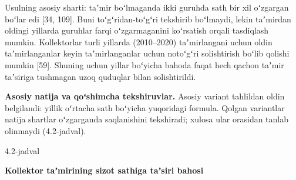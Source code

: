 \documentclass[14pt,a4paper,oneside]{extreport}
\newcommand{\oakilovanom}[1]{{\centering\setstretch{1}\bfseries #1\par}\nopagebreak\vspace{2pt}}
\newcommand{\oakjadvalnum}[1]{\par\Needspace{12\baselineskip}\vspace{2pt}\noindent\hfill #1\par\nopagebreak}
\begin{document}
Usulning asosiy sharti: taʼmir boʻlmaganda ikki guruhda sath bir xil
oʻzgargan boʻlar edi {[}34, 109{]}. Buni toʻgʻridan-toʻgʻri tekshirib
boʻlmaydi, lekin taʼmirdan oldingi yillarda guruhlar farqi
oʻzgarmaganini koʻrsatish orqali tasdiqlash mumkin. Kollektorlar turli
yillarda (2010--2020) taʼmirlangani uchun oldin taʼmirlanganlar keyin
taʼmirlanganlar uchun notoʻgʻri solishtirish boʻlib qolishi mumkin
{[}59{]}. Shuning uchun yillar boʻyicha bahoda faqat hech qachon taʼmir
taʼsiriga tushmagan uzoq quduqlar bilan solishtirildi.

\textbf{Asosiy natija va qoʻshimcha tekshiruvlar.} Asosiy variant
tahlildan oldin belgilandi: yillik oʻrtacha sath boʻyicha yuqoridagi
formula. Qolgan variantlar natija shartlar oʻzgarganda saqlanishini
tekshiradi; xulosa ular orasidan tanlab olinmaydi (4.2-jadval).

\oakjadvalnum{4.2-jadval}

\oakilovanom{\textbf{Kollektor taʼmirining sizot sathiga taʼsiri bahosi}}
\end{document}
